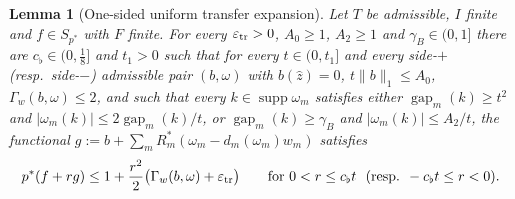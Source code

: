 \documentclass[10pt]{amsart}
\newtheorem{lemma}[theorem]{Lemma}
\theoremstyle{definition}
\theoremstyle{remark}
\newcommand{\supp}{\operatorname{supp}}
\newcommand{\gap}{\operatorname{gap}}
\newcommand{\zh}{\hat z}
\begin{document}
\begin{lemma}[One-sided uniform transfer expansion]\label{lem:onesidedtransfer}
Let $T$ be admissible, $I$ finite and $f\in S_{p^*}$ with $F$ finite.  For
every $\varepsilon_{\rm tr}>0$, $A_0\ge1$, $A_2\ge1$ and $\gamma_B\in(0,1]$
there are $c_\flat\in(0,\frac18]$ and $t_1>0$ such that for every
$t\in(0,t_1]$ and every side-$+$ \textup{(}resp.\ side-$-$\textup{)}
admissible pair $(b,\omega)$ with $b(\zh)=0$, $t\|b\|_1\le A_0$,
$\Gamma_w(b,\omega)\le2$, and such that every $k\in\supp\omega_m$ satisfies
either $\gap_m(k)\ge t^2$ and $|\omega_m(k)|\le2\gap_m(k)/t$, or
$\gap_m(k)\ge\gamma_B$ and $|\omega_m(k)|\le A_2/t$, the functional
$g:=b+\sum_mR_m^*(\omega_m-d_m(\omega_m)w_m)$ satisfies
\[
 p^*(f+rg)\le1+\frac{r^2}2\big(\Gamma_w(b,\omega)+\varepsilon_{\rm tr}\big)
 \qquad\text{for }0<r\le c_\flat t\ \ \textup{(}\text{resp. }-c_\flat t\le
 r<0\textup{)}.
\]
\end{lemma}
\end{document}
